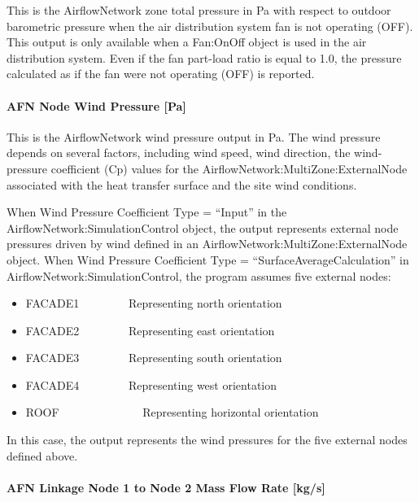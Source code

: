 This is the AirflowNetwork zone total pressure in Pa with respect to outdoor barometric pressure when the air distribution system fan is not operating (OFF). This output is only available when a Fan:OnOff object is used in the air distribution system. Even if the fan part-load ratio is equal to 1.0, the pressure calculated as if the fan were not operating (OFF) is reported.

\paragraph{AFN Node Wind Pressure {[}Pa{]}}\label{afn-node-wind-pressure-pa}

This is the AirflowNetwork wind pressure output in Pa. The wind pressure depends on several factors, including wind speed, wind direction, the wind-pressure coefficient (Cp) values for the AirflowNetwork:MultiZone:ExternalNode associated with the heat transfer surface and the site wind conditions.

When Wind Pressure Coefficient Type = ``Input'' in the AirflowNetwork:SimulationControl object, the output represents external node pressures driven by wind defined in an AirflowNetwork:MultiZone:ExternalNode object. When Wind Pressure Coefficient Type = ``SurfaceAverageCalculation'' in AirflowNetwork:SimulationControl, the program assumes five external nodes:

\begin{itemize}
\item
  FACADE1~~~~~~~~ Representing north orientation
\item
  FACADE2~~~~~~~~ Representing east orientation
\item
  FACADE3~~~~~~~~ Representing south orientation
\item
  FACADE4~~~~~~~~ Representing west orientation
\item
  ROOF~~~~~~~~~~~~~~ Representing horizontal orientation
\end{itemize}

In this case, the output represents the wind pressures for the five external nodes defined above.

\paragraph{AFN Linkage Node 1 to Node 2 Mass Flow Rate {[}kg/s{]}}\label{afn-linkage-node-1-to-node-2-mass-flow-rate-kgs}

